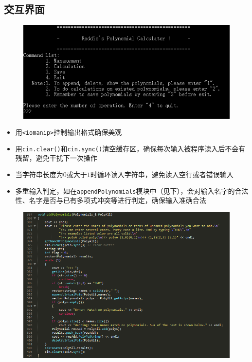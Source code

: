 \documentclass[11pt,UTF8]{ctexart}
\begin{document}
\subsection{交互界面}
\begin{figure}[H]
\centering
\includegraphics[width=\linewidth]{pic/interface.PNG}
\label{Fig:interface}
\end{figure}
\begin{itemize}
	\item 用\verb'<iomanip>'控制输出格式确保美观
	\item 用\verb'cin.clear()'和\verb'cin.sync()'清空缓存区，确保每次输入被程序读入后不会有残留，避免干扰下一次操作
	\item 当字符串长度为$0$或大于$1$时循环读入字符串，避免读入空行或者错误输入
	\item 多重输入判定，如在\verb'appendPolynomials'模块中（见下），会对输入名字的合法性、名字是否与已有多项式冲突等进行判定，确保输入准确合法
\end{itemize}
\begin{figure}[H]
\centering
\includegraphics[width=\linewidth]{pic/add.PNG}
\label{Fig:add}
\end{figure}
\end{document}
